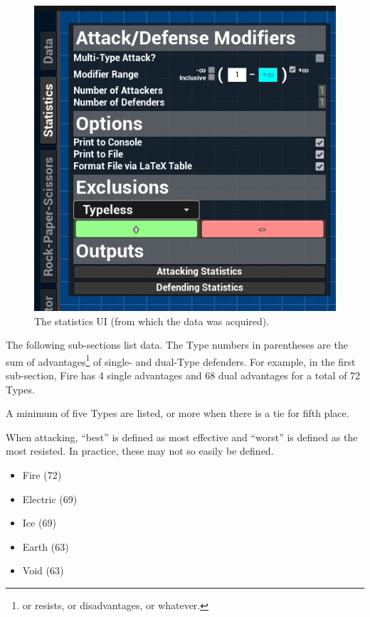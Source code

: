 \begin{figure}[H]
	\begin{center}
		\includegraphics[scale=2]{statistics-ui}
		\caption{The statistics UI (from which the data was acquired).}
		\label{fig:stats-ui}
	\end{center}
\end{figure}

The following sub-sections list data. The Type numbers in parentheses are the sum of advantages\footnote{or resists, or disadvantages, or whatever.} of single- and dual-Type defenders. For example, in the first sub-section, Fire has 4 single advantages and 68 dual advantages for a total of 72 Types.

A minimum of five Types are listed, or more when there is a tie for fifth place.


When attacking, ``best'' is defined as most effective and ``worst'' is defined as the most resisted. In practice, these may not so easily be defined.




\begin{itemize}
	\item{Fire (72)}
	\item{Electric (69)}
	\item{Ice (69)}
	\item{Earth (63)}
	\item{Void (63)}
\end{itemize}

